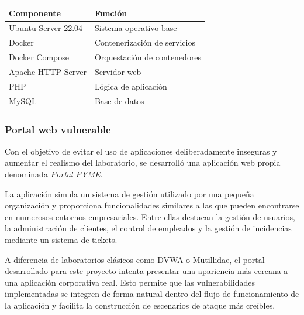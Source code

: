 \begin{table}[h]
    \centering

    \setlength{\arrayrulewidth}{0.05mm}

    \begin{tabular}{|C{5cm}|C{8cm}|}
        \hline
        \textbf{Componente} & \textbf{Función}             \\
        \hline
        Ubuntu Server 22.04 & Sistema operativo base       \\
        \hline
        Docker              & Contenerización de servicios \\
        \hline
        Docker Compose      & Orquestación de contenedores \\
        \hline
        Apache HTTP Server  & Servidor web                 \\
        \hline
        PHP                 & Lógica de aplicación         \\
        \hline
        MySQL               & Base de datos                \\
        \hline
    \end{tabular}

    \renewcommand{\arraystretch}{1}
    \label{tab:stack_tecnologico}
\end{table}

\vspace{0.5cm}

\subsubsection{Portal web vulnerable}

Con el objetivo de evitar el uso de aplicaciones deliberadamente inseguras y aumentar el realismo del laboratorio, se desarrolló una aplicación web propia denominada \textit{Portal PYME}.

La aplicación simula un sistema de gestión utilizado por una pequeña organización y proporciona funcionalidades similares a las que pueden encontrarse en numerosos entornos empresariales. Entre ellas destacan la gestión de usuarios, la administración de clientes, el control de empleados y la gestión de incidencias mediante un sistema de tickets.

A diferencia de laboratorios clásicos como DVWA o Mutillidae, el portal desarrollado para este proyecto intenta presentar una apariencia más cercana a una aplicación corporativa real. Esto permite que las vulnerabilidades implementadas se integren de forma natural dentro del flujo de funcionamiento de la aplicación y facilita la construcción de escenarios de ataque más creíbles.

